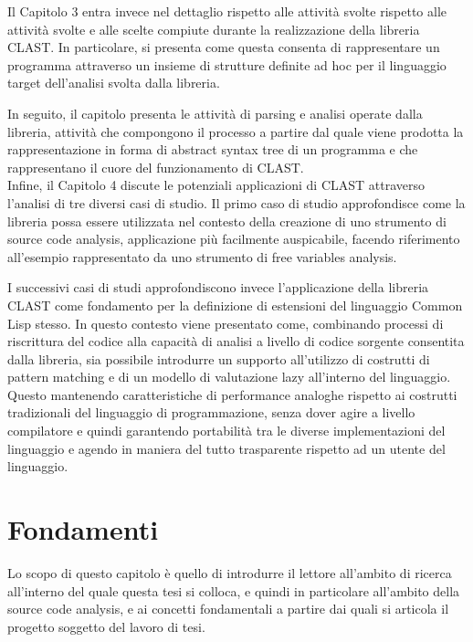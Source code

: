\documentclass{book}
\begin{document}
Il Capitolo 3 entra invece nel dettaglio rispetto alle attività svolte rispetto
alle attività svolte e alle scelte compiute durante la realizzazione della
libreria CLAST. In particolare, si presenta come questa consenta di
rappresentare un programma attraverso un insieme di strutture definite ad hoc
per il linguaggio target dell’analisi svolta dalla libreria.

In seguito, il capitolo presenta le attività di parsing e analisi operate dalla
libreria, attività che compongono il processo a partire dal quale viene prodotta
la rappresentazione in forma di abstract syntax tree di un programma e che
rappresentano il cuore del funzionamento di CLAST.\\

Infine, il Capitolo 4 discute le potenziali applicazioni di CLAST attraverso
l’analisi di tre diversi casi di studio. Il primo caso di studio approfondisce
come la libreria possa essere utilizzata nel contesto della creazione di uno
strumento di source code analysis, applicazione più facilmente auspicabile,
facendo riferimento all’esempio rappresentato da uno strumento di free variables
analysis.

I successivi casi di studi approfondiscono invece l’applicazione della libreria
CLAST come fondamento per la definizione di estensioni del linguaggio Common
Lisp stesso. In questo contesto viene presentato come, combinando processi di
riscrittura del codice alla capacità di analisi a livello di codice sorgente
consentita dalla libreria, sia possibile introdurre un supporto all’utilizzo di
costrutti di pattern matching e di un modello di valutazione lazy all’interno
del linguaggio. Questo mantenendo caratteristiche di performance analoghe
rispetto ai costrutti tradizionali del linguaggio di programmazione, senza dover
agire a livello compilatore e quindi garantendo portabilità tra le diverse
implementazioni del linguaggio e agendo in maniera del tutto trasparente
rispetto ad un utente del linguaggio.



\begingroup
\let\clearpage\relax

\chapter{Fondamenti}

Lo scopo di questo capitolo è quello di introdurre il lettore all’ambito di
ricerca all’interno del quale questa tesi si colloca, e quindi in particolare
all’ambito della source code analysis, e ai concetti fondamentali a partire dai
quali si articola il progetto soggetto del lavoro di tesi.\\
\end{document}
